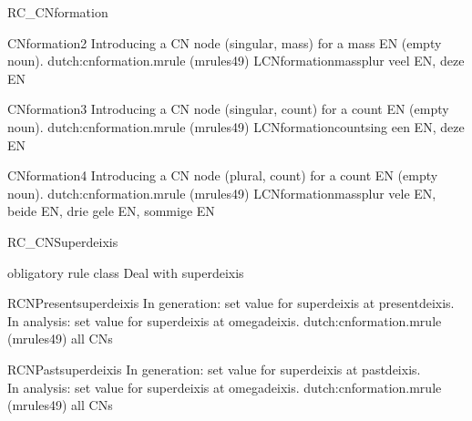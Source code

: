 \begin{mruleclass}{RC\_CNformation}
\begin{members}
\begin{member}
\begin{enumerate}
\end{enumerate}
\end{member}
\begin{member}
 CNformation2
Introducing a CN node (singular, mass) for a mass EN (empty noun).
\file dutch:cnformation.mrule (mrules49)
\semantics LCNformationmassplur
\example veel EN, deze EN
\remarks\mbox{}
\end{member}
\begin{member}
 CNformation3
 Introducing a CN node (singular, count) for a count EN (empty noun).
\file dutch:cnformation.mrule (mrules49)
\semantics LCNformationcountsing
\example een EN, deze EN 
\end{member}
\begin{member}
 CNformation4
 Introducing a CN node (plural, count) for a count EN (empty noun).
\file dutch:cnformation.mrule (mrules49)
\semantics LCNformationmassplur
\example vele EN, beide EN, drie gele EN, sommige EN

\end{member}
\end{members}
\end{mruleclass}
\begin{mruleclass}{RC\_CNSuperdeixis}
\begin{classdescr}
\kind obligatory rule class
\classtask Deal with superdeixis
\classremarks

\nofilters

\nospeedrules

\noplannedrules

\norulesnotince


\end{classdescr}

\begin{members}
   
\begin{member}
 RCNPresentsuperdeixis
 In generation: set value for superdeixis at presentdeixis.\\
               In analysis: set value for superdeixis at omegadeixis.    
\file dutch:cnformation.mrule (mrules49)
\semantics \nosemantics
\example all CNs
\remarks\mbox{}

\end{member}
\begin{member}
 RCNPastsuperdeixis
 In generation: set value for superdeixis at pastdeixis.\\
               In analysis: set value for superdeixis at omegadeixis.    
\file dutch:cnformation.mrule (mrules49)
\semantics \nosemantics
\example all CNs 
\remarks\mbox{}

\end{member}
\end{members}
\end{mruleclass}
